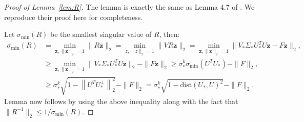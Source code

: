 \documentclass[11pt]{article}
\newtheorem{theorem}[lemma]{Theorem}
\newcommand{\calN}{{\cal N}}
\newcommand{\R}{\mathbb{R}}
\newcommand{\tp}[1]{{#1}^{T}}
\newcommand{\dist}{\mathrm{dist}}
\newcommand{\twonorm}[1]{\left\| {#1} \right\|_2}
\newcommand{\calA}{\mathcal{A}}
\newcommand{\Vt}{V_{h}}
\newcommand{\Ut}{U_{t}}
\newcommand{\Vo}{V_*}
\newcommand{\Uot}{\tp{U}_*}
\newcommand{\So}{\Sigma_*}
\newcommand{\Uo}{U_*}
\newcommand{\so}{\sigma_*}
\newcommand{\Wo}{W_*}
\newcommand{\Wt}{W_t}
\newcommand{\St}{\Sigma_t}
\newcommand{\z}{\bm{z}}
\newcommand{\x}{\bm{x}}
\newcommand{\y}{\bm{y}}
\begin{document}
\begin{proof}[Proof of Lemma~\ref{lem:R}]
The lemma is exactly the same as Lemma 4.7 of \cite{JainNS13}. We reproduce their proof here for completeness. 

Let $\sigma_{\text{min}}(R)$ be the smallest singular value of $R$, then: 
\begin{align}
  \sigma_{\text{min}}(R)&=\min_{\z, \|\z\|_2=1}\|R\z\|_2=\min_{z, \|z\|_2=1}\|VR\z\|_2=\min_{\z, \|\z\|_2=1}\|\Vo\So\Uot  U\z-F\z\|_2, \nonumber\\
&\geq \min_{\z, \|\z\|_2=1}\|\Vo\So\Uot  U\z\|_2-\|F\z\|_2\geq \so^k\sigma_{\text{min}}(U^T\Uo)-\|F\|_2,\nonumber\\
&\geq \so^k\sqrt{1-\twonorm{U^T\Uo^\perp}^2}-\|F\|_2=\so^k\sqrt{1-\dist(\Uo, U)^2}-\|F\|_2. 
\end{align}
Lemma now follows by using the above inequality along with the fact that $\|R^{-1}\|_2\leq 1/\sigma_{\text{min}}(R)$.
\end{proof}

\end{document}

